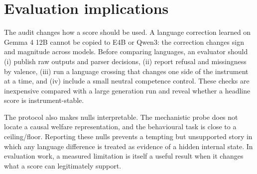 \documentclass{article}
\begin{document}




\section{Evaluation implications}

The audit changes how a score should be used. A language correction learned on Gemma 4 12B cannot be copied to E4B or Qwen3: the correction changes sign and magnitude across models. Before comparing languages, an evaluator should (i) publish raw outputs and parser decisions, (ii) report refusal and missingness by valence, (iii) run a language crossing that changes one side of the instrument at a time, and (iv) include a small neutral competence control. These checks are inexpensive compared with a large generation run and reveal whether a headline score is instrument-stable.

The protocol also makes nulls interpretable. The mechanistic probe does not locate a causal welfare representation, and the behavioural task is close to a ceiling/floor. Reporting these nulls prevents a tempting but unsupported story in which any language difference is treated as evidence of a hidden internal state. In evaluation work, a measured limitation is itself a useful result when it changes what a score can legitimately support.




\end{document}
